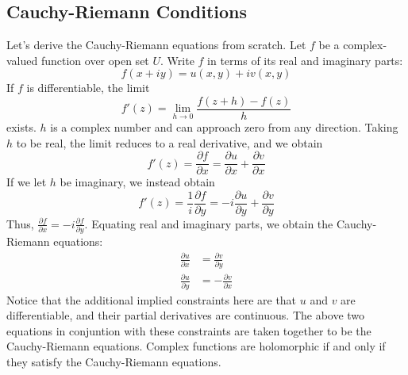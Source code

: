 \documentclass{article}
\begin{document}
\subsection{Cauchy-Riemann Conditions}
Let's derive the Cauchy-Riemann equations from scratch. Let $ f $ be a complex-valued function over open set $ U $. Write $ f $ in terms of its real and imaginary parts:
$$ f(x + i y) = u(x, y) + i v(x, y) $$
If $ f $ is differentiable, the limit
$$ f'(z) = \lim_{h \to 0} \frac{f(z + h) - f(z)}{h} $$
exists. $ h $ is a complex number and can approach zero from any direction. Taking $ h $ to be real, the limit reduces to a real derivative, and we obtain
$$ f'(z) = \frac{\partial f}{\partial x} = \frac{\partial u}{\partial x} + \frac{\partial v}{\partial x} $$
If we let $ h $ be imaginary, we instead obtain
$$ f'(z) = \frac{1}{i} \frac{\partial f}{\partial y} = -i \frac{\partial u}{\partial y} + \frac{\partial v}{\partial y} $$
Thus, $ \frac{\partial f}{\partial x} = -i \frac{\partial f}{\partial y} $. Equating real and imaginary parts, we obtain the Cauchy-Riemann equations:
$$ \begin{aligned}
    \frac{\partial u}{\partial x} &= \frac{\partial v}{\partial y} \\
    \frac{\partial u}{\partial y} &= - \frac{\partial v}{\partial x}
\end{aligned} $$
Notice that the additional implied constraints here are that $ u $ and $ v $ are differentiable, and their partial derivatives are continuous. The above two equations in conjuntion with these constraints are taken together to be the Cauchy-Riemann equations. Complex functions are holomorphic if and only if they satisfy the Cauchy-Riemann equations.
\end{document}

